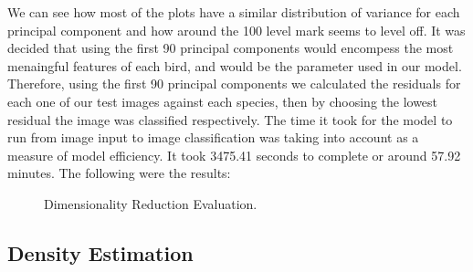 \documentclass[11pt]{article}
\begin{document}
\begin{singlespace}
We can see how most of the plots have a similar distribution of variance for each principal component and how around the 100 level mark seems to level off. It was decided that using the first 90 principal components would encompess the most menaingful features of each bird, and would be the parameter used in our model. Therefore, using the first 90 principal components we calculated the residuals for each one of our test images against each species, then by choosing the lowest residual the image was classified respectively. The time it took for the model to run from image input to image classification was taking into account as a measure of model efficiency. It took 3475.41 seconds to complete or around 57.92 minutes. The following were the results: \\
\begin{figure}[h]
    \centering
    
    \caption{Dimensionality Reduction Evaluation.}
\end{figure} 


\subsection{Density Estimation}


\end{singlespace}
\end{document}
